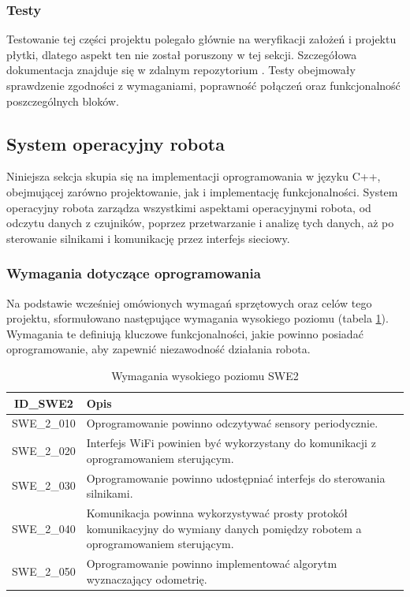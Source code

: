 \documentclass[12pt,twoside]{article}
\begin{document}
\subsubsection{Testy}
Testowanie tej części projektu polegało głównie na weryfikacji założeń i projektu płytki, dlatego aspekt ten nie został poruszony w tej sekcji. Szczegółowa dokumentacja znajduje się w zdalnym repozytorium \cite{repo}. Testy obejmowały sprawdzenie zgodności z wymaganiami, poprawność połączeń oraz funkcjonalność poszczególnych bloków.

\newpage

\subsection{System operacyjny robota}

Niniejsza sekcja skupia się na implementacji oprogramowania w języku C++, obejmującej zarówno projektowanie, jak i implementację funkcjonalności. System operacyjny robota zarządza wszystkimi aspektami operacyjnymi robota, od odczytu danych z czujników, poprzez przetwarzanie i analizę tych danych, aż po sterowanie silnikami i komunikację  przez interfejs sieciowy.

\subsubsection{Wymagania dotyczące oprogramowania}

Na podstawie wcześniej omówionych wymagań sprzętowych oraz celów tego projektu, sformułowano następujące wymagania wysokiego poziomu (tabela \ref{Tab:SWE2}). Wymagania te definiują kluczowe funkcjonalności, jakie powinno posiadać oprogramowanie, aby zapewnić niezawodność działania robota.

\begin{table}[ht]
\caption{Wymagania wysokiego poziomu SWE2}
\centering		
	\begin{tabular}{|c|p{}|}	
		\hline
		ID\_SWE2 & Opis \\
		\hline
		SWE\_2\_010 & Oprogramowanie powinno odczytywać sensory periodycznie. \\
		\hline
		SWE\_2\_020 & Interfejs WiFi powinien być wykorzystany do komunikacji z oprogramowaniem sterującym. \\
		\hline 
		SWE\_2\_030 & Oprogramowanie powinno udostępniać interfejs do sterowania silnikami.\\
		\hline
		SWE\_2\_040 & Komunikacja powinna wykorzystywać prosty protokół komunikacyjny do wymiany danych pomiędzy robotem a oprogramowaniem sterującym. \\
		\hline
		SWE\_2\_050 & Oprogramowanie powinno implementować algorytm wyznaczający odometrię. \\
		\hline

	\end{tabular}	
	
\label{Tab:SWE2}
\end{table}	
\end{document}
